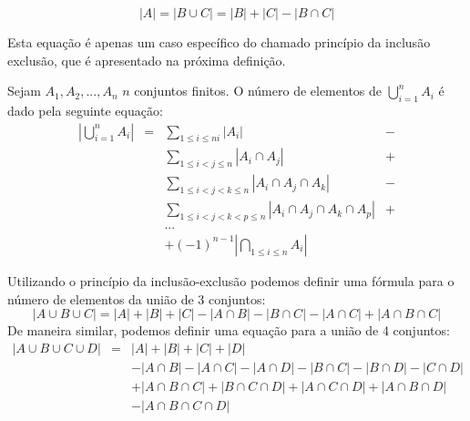 \[|A| = |B\cup C| = |B| + |C| - |B\cap C|\]

Esta equação é apenas um caso específico do chamado princípio da
inclusão exclusão, que é apresentado na próxima definição.

\begin{Definition}
Sejam $A_1,A_2,...,A_n$ $n$ conjuntos finitos. O número de elementos
de $\bigcup_{i=1}^{n}A_i$ é dado pela seguinte equação:
\[
\begin{array}{lclc}
|\bigcup_{i=1}^nA_i| & = & \sum_{1\leq i \leq ni}|A_i| & - \\
                                &    & \sum_{1\leq i < j \leq
                                  n}|A_i\cap A_j| & + \\
                                &   & \sum_{1\leq i < j < k \leq n}|A_i
                                \cap A_j \cap A_k| & - \\
                                &   & \sum_{1\leq i < j < k < p \leq
                                  n}|A_i \cap A_j \cap A_k \cap A_p| &
                                + \\
                                &   & ... \\
                                &   & + (-1)^{n - 1}|\bigcap_{1\leq
                                  i\leq n} A_i|
\end{array}
\]
\end{Definition}
\begin{Example}
Utilizando o princípio da inclusão-exclusão podemos definir uma
fórmula para o número de elementos da união de 3 conjuntos:
\[
|A\cup B \cup C| = |A| + |B| + |C| - |A\cap B| - |B \cap C| - |A \cap
C| + |A \cap B \cap C|
\]
De maneira similar, podemos definir uma equação para a união de 4
conjuntos:
\[
\begin{array}{lcl}
|A\cup B\cup C \cup D| & = & |A| + |B| + |C| + |D|\\
                                       &    & - |A \cap B| - |A \cap
                                       C| - |A \cap D| - |B \cap C| -
                                       |B \cap D| - |C \cap D| \\
                                       &    & + |A \cap B \cap C| +
                                                    |B \cap C \cap D|
                                                    +
                                                    |A \cap C \cap
                                                    D| + |A \cap B
                                                    \cap D|\\
                                       &    & - |A\cap B \cap C \cap D|

\end{array}
\]
\end{Example}
